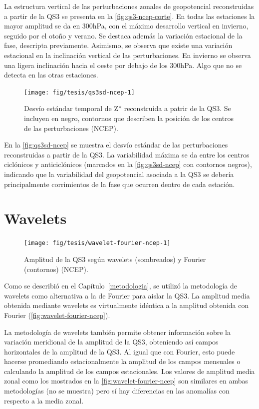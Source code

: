 \documentclass[spanish,a4paper,12pt,oneside]{book}
\begin{document}
La estructura vertical de las perturbaciones zonales de geopotencial
reconstruidas a partir de la QS3 se presenta en la
\autoref{fig:qs3-ncep-corte}. En todas las estaciones la mayor amplitud
se da en 300hPa, con el máximo desarrollo vertical en invierno, seguido
por el otoño y verano. Se destaca además la variación estacional de la
fase, descripta previamente. Asimismo, se observa que existe una
variación estacional en la inclinación vertical de las perturbaciones.
En invierno se observa una ligera inclinación hacia el oeste por debajo
de los 300hPa. Algo que no se detecta en las otras estaciones.

\begin{figure}
\texttt{[image: fig/tesis/qs3sd-ncep-1]} \caption{Desvío estándar temporal de Z* reconstruida a patrir de la QS3. Se incluyen en negro, contornos que describen la posición de los centros de las perturbaciones (NCEP).}\label{fig:qs3sd-ncep}
\end{figure}

En la \autoref{fig:qs3sd-ncep} se muestra el desvío estándar de las
perturbaciones reconstruidas a partir de la QS3. La variabilidad máxima
se da entre los centros ciclónicos y anticiclónicos (marcados en la
\autoref{fig:qs3sd-ncep} con contornos negros), indicando que la
variabilidad del geopotencial asociada a la QS3 se debería
principalmente corrimientos de la fase que ocurren dentro de cada
estación.

\section*{Wavelets}

\begin{figure}
\texttt{[image: fig/tesis/wavelet-fourier-ncep-1]} \caption{Amplitud de la QS3 según wavelets (sombreados) y Fourier (contornos) (NCEP).}\label{fig:wavelet-fourier-ncep}
\end{figure}

Como se describió en el Capítulo~\ref{metodologia}, se utilizó la
metodología de wavelets como alternativa a la de Fourier para aislar la
QS3. La amplitud media obtenida mediante wavelets es virtualmente
idéntica a la amplitud obtenida con Fourier
(\autoref{fig:wavelet-fourier-ncep}).

La metodología de wavelets también permite obtener información sobre la
variación meridional de la amplitud de la QS3, obteniendo así campos
horizontales de la amplitud de la QS3. Al igual que con Fourier, esto
puede hacerse promediando estacionalmente la amplitud de los campos
mensuales o calculando la amplitud de los campos estacionales. Los
valores de amplitud media zonal como los mostrados en la
\autoref{fig:wavelet-fourier-ncep} son similares en ambas metodologías
(no se muestra) pero sí hay diferencias en las anomalías con respecto a
la media zonal.
\end{document}
